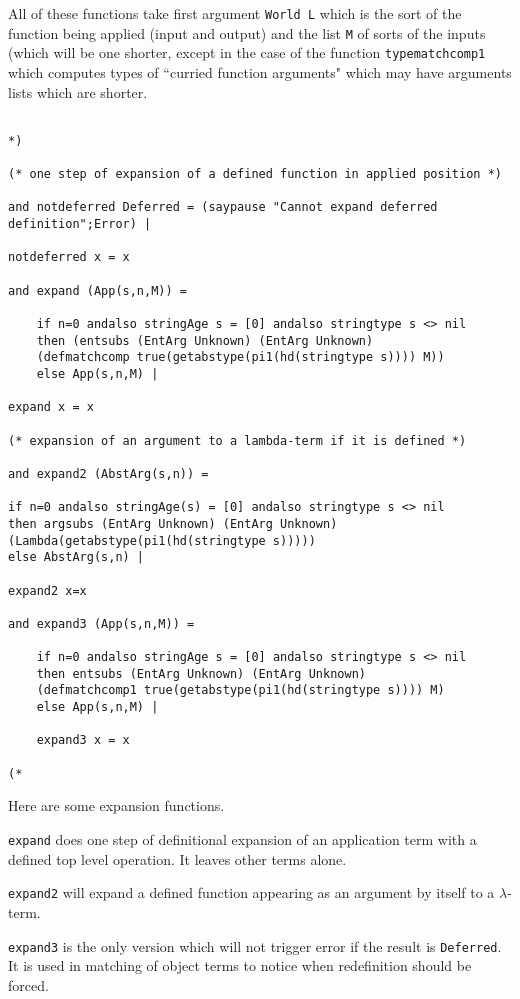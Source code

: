 \documentclass{article}
\begin{document}
All of these functions take first argument {\tt World L} which is the sort of the function being applied (input and output) and the list {\tt M} of sorts of the inputs (which will be one shorter, except in the case of the function {\tt typematchcomp1} which computes types of ``curried function arguments" which may have arguments lists which are shorter.

\begin{verbatim}

*)

(* one step of expansion of a defined function in applied position *)

and notdeferred Deferred = (saypause "Cannot expand deferred definition";Error) |

notdeferred x = x 

and expand (App(s,n,M)) = 

    if n=0 andalso stringAge s = [0] andalso stringtype s <> nil
    then (entsubs (EntArg Unknown) (EntArg Unknown) 
    (defmatchcomp true(getabstype(pi1(hd(stringtype s)))) M))
    else App(s,n,M) | 

expand x = x

(* expansion of an argument to a lambda-term if it is defined *)

and expand2 (AbstArg(s,n)) =

if n=0 andalso stringAge(s) = [0] andalso stringtype s <> nil
then argsubs (EntArg Unknown) (EntArg Unknown) 
(Lambda(getabstype(pi1(hd(stringtype s)))))
else AbstArg(s,n) |

expand2 x=x

and expand3 (App(s,n,M)) = 

    if n=0 andalso stringAge s = [0] andalso stringtype s <> nil
    then entsubs (EntArg Unknown) (EntArg Unknown) 
    (defmatchcomp1 true(getabstype(pi1(hd(stringtype s)))) M)
    else App(s,n,M) |
	
	expand3 x = x

(*

\end{verbatim}

Here are some expansion functions.

{\tt expand} does one step of definitional expansion of an application term with a defined top level operation.  It leaves other terms alone.

{\tt expand2} will expand a defined function appearing as an argument by itself to a $\lambda$-term.

{\tt expand3} is the only version which will not trigger error if the result is {\tt Deferred}.  It is used in matching of object terms to notice when redefinition should be forced.
\end{document}
